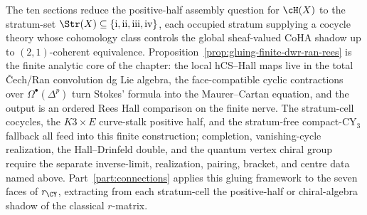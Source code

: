The ten sections reduce the positive-half assembly question for
$\cH(X)$ to the stratum-set
$\Str(X) \subseteq \{\mathrm{i}, \mathrm{ii}, \mathrm{iii},
\mathrm{iv}\}$, each occupied stratum supplying a cocycle theory whose
cohomology class controls the global sheaf-valued CoHA shadow up to
$(2,1)$-coherent equivalence. Proposition~\ref{prop:gluing-finite-dwr-ran-rees}
is the finite analytic core of the chapter: the local hCS--Hall maps
live in the total \v{C}ech/Ran convolution dg Lie algebra, the
face-compatible cyclic contractions over $\Omega^\bullet(\Delta^p)$
turn Stokes' formula into the Maurer--Cartan equation, and the output
is an ordered Rees Hall comparison on the finite nerve. The
stratum-cell cocycles, the $K3\times E$ curve-stalk positive half, and
the stratum-free compact-CY$_3$ fallback all feed into this finite
construction; completion, vanishing-cycle realization, the Hall--Drinfeld
double, and the quantum vertex chiral group require the separate
inverse-limit, realization, pairing, bracket, and centre data named
above. Part~\ref{part:connections} applies this gluing framework to
the seven faces of $r_{\CY}$, extracting from each stratum-cell the
positive-half or chiral-algebra shadow of the classical $r$-matrix.
